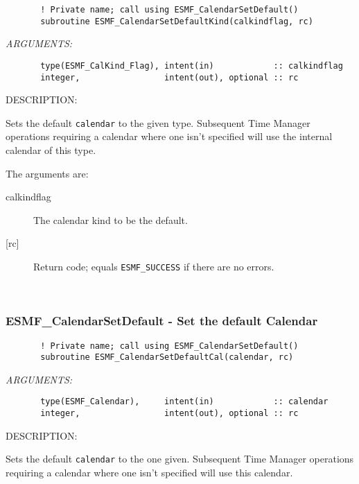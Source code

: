  
\begin{verbatim}       ! Private name; call using ESMF_CalendarSetDefault()
       subroutine ESMF_CalendarSetDefaultKind(calkindflag, rc)
 \end{verbatim}{\em ARGUMENTS:}
\begin{verbatim}       type(ESMF_CalKind_Flag), intent(in)            :: calkindflag
       integer,                 intent(out), optional :: rc
 \end{verbatim}
{\sf DESCRIPTION:\\ }


       Sets the default {\tt calendar} to the given type.  Subsequent Time
       Manager operations requiring a calendar where one isn't specified will
       use the internal calendar of this type.
  
       The arguments are:
       \begin{description}
       \item[calkindflag]
            The calendar kind to be the default.
       \item[{[rc]}]
            Return code; equals {\tt ESMF\_SUCCESS} if there are no errors.
       \end{description}
       
 
\mbox{}\hrulefill\ 
 
\subsubsection [ESMF\_CalendarSetDefault] {ESMF\_CalendarSetDefault - Set the default Calendar}


 
\begin{verbatim}       ! Private name; call using ESMF_CalendarSetDefault()
       subroutine ESMF_CalendarSetDefaultCal(calendar, rc)
 \end{verbatim}{\em ARGUMENTS:}
\begin{verbatim}       type(ESMF_Calendar),     intent(in)            :: calendar
       integer,                 intent(out), optional :: rc
 \end{verbatim}
{\sf DESCRIPTION:\\ }


       Sets the default {\tt calendar} to the one given.  Subsequent Time
       Manager operations requiring a calendar where one isn't specified will
       use this calendar.
  

